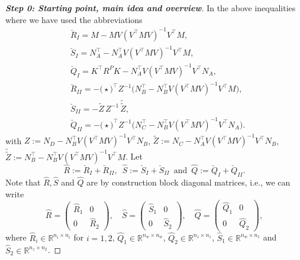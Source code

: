 \documentclass[11pt,a4paper,oneside,DIV=12,headings=small]{scrartcl}
\newcommand{\Rset}{\mathbb{R}}
\theoremstyle{plain}
\begin{document}
\begin{proof}[\textbf{Step 0: \emph{Starting point, main idea and overview}}]
In the above inequalities where we have used the abbreviations
\begin{subequations}
\label{NewLabel_1}
\begin{align}
& \breve{R}_I=M-MV(V^\top M V)^{-1}V^\top M,  \\
& \breve{S}_I=N_A^\top - N_A^\top V (V^\top M V)^{-1}V^\top M,  \\
& \breve{Q}_I=K^\top R^P K-N_A^\top V (V^\top M V)^{-1} V^\top N_A,  \\
& \breve{R}_{II}=-\Big(\star \Big)^\top Z^{-1}\Big(N_B^\top-N_B^\top V (V^\top M V)^{-1} V^\top M \Big),  \\
& \breve{S}_{II}=-\tilde{Z}\,Z^{-1}\, \tilde{\tilde{Z}},  \\
& \breve{Q}_{II}=-\Big(\star \Big)^\top Z^{-1}\Big(N_C^\top- N_B^\top V (V^\top M V)^{-1} V^\top N_A \Big). 
\end{align}
\end{subequations}
with $Z:=N_D-N_B^\top V (V^\top M V)^{-1} V^\top N_B$, $\tilde{Z}:=N_C-N_A^\top V (V^\top M V)^{-1}V^\top N_B$, $\tilde{\tilde{Z}}:= N_B^\top-N_B^\top V (V^\top M V)^{-1} V^\top M$.
Let 
\begin{equation}
\label{NewLabel_2}
\hat{R}:=\breve{R}_{I}+\breve{R}_{II}, \,\,\, \hat{S}:=\breve{S}_{I}+\breve{S}_{II} \,\,\, \text{and} \,\,\, \hat{Q}:=\breve{Q}_{I}+\breve{Q}_{II}.
\end{equation}
Note that $\hat{R}, \hat{S}$ and $\hat{Q}$ are by construction block diagonal matrices, i.e., we can write
\[\hat{R}=\begin{pmatrix} \hat{R}_1 & 0 \\ 0 & \hat{R}_2 \end{pmatrix}, \quad
\hat{S}=\begin{pmatrix} \hat{S}_1 & 0 \\ 0 & \hat{S}_2 \end{pmatrix}, \quad
\hat{Q}=\begin{pmatrix} \hat{Q}_1 & 0 \\ 0 & \hat{Q}_2 \end{pmatrix},
\]
where $\hat{R}_i \in \Rset^{n_i \times n_i}$ for $i=1,2$, $\hat{Q}_1 \in \Rset^{n_w \times n_w}$, $\hat{Q}_2 \in \Rset^{n_z \times n_z}$, $\hat{S}_1 \in \Rset^{n_w \times n_1}$ and $\hat{S}_2 \in \Rset^{n_z \times n_2}$.


\end{proof}
\end{document}
